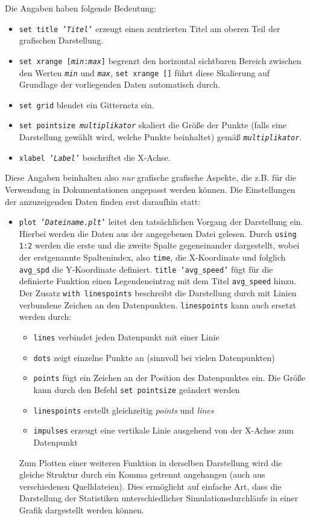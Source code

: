 Die Angaben haben folgende Bedeutung:
\begin{itemize}
\item \texttt{set title '\textit{Titel}'} erzeugt einen zentrierten Titel am oberen Teil der grafischen Darstellung.
\item \texttt{set xrange [\textit{min}:\textit{max}]} begrenzt den horizontal sichtbaren Bereich zwischen den Werten \texttt{\textit{min}} und \texttt{\textit{max}}, \texttt{set xrange []} führt diese Skalierung auf Grundlage der vorliegenden Daten automatisch durch.
\item \texttt{set grid} blendet ein Gitternetz ein.
\item \texttt{set pointsize \textit{multiplikator}} skaliert die Größe der Punkte (falls eine Darstellung gewählt wird, welche Punkte beinhaltet) gemäß \texttt{\textit{multiplikator}}.
\item \texttt{xlabel '\textit{Label}'} beschriftet die X-Achse.
\end{itemize}
Diese Angaben beinhalten also \textit{nur} grafische grafische Aspekte, die z.B. für die Verwendung in Dokumentationen angepasst werden können. Die Einstellungen der anzuzeigenden Daten finden erst daraufhin statt:

\begin{itemize}
 \item \texttt{plot '\textit{Dateiname.plt}'} leitet den tatsächlichen Vorgang der Darstellung ein. Hierbei werden die Daten aus der angegebenen Datei gelesen. Durch \texttt{using 1:2} werden die erste und die zweite Spalte gegeneinander dargestellt, wobei der erstgenannte Spaltenindex, also \texttt{time}, die X-Koordinate und folglich \texttt{avg\_spd} die Y-Koordinate definiert. \texttt{title `avg\_speed'} fügt für die definierte Funktion einen Legendeneintrag mit dem Titel \texttt{avg\_speed} hinzu. Der Zusatz \texttt{with linespoints} beschreibt die Darstellung durch mit Linien verbundene Zeichen an den Datenpunkten. \texttt{linespoints} kann auch ersetzt werden durch:
\begin{itemize}
\item \texttt{lines} verbindet jeden Datenpunkt mit einer Linie
\item \texttt{dots} zeigt einzelne Punkte an (sinnvoll bei vielen Datenpunkten)
\item \texttt{points} fügt ein Zeichen an der Position des Datenpunktes ein. Die Größe kann durch den Befehl \texttt{set pointsize} geändert werden
\item \texttt{linespoints} erstellt gleichzeitig \textit{points} und \textit{lines}
\item \texttt{impulses} erzeugt eine vertikale Linie ausgehend von der X-Achse zum Datenpunkt
\end{itemize}
Zum Plotten einer weiteren Funktion in derselben Darstellung wird die gleiche Struktur durch ein Komma getrennt angehangen (auch aus verschiedenen Quelldateien). Dies ermöglicht auf einfache Art, dass die Darstellung der Statistiken unterschiedlicher Simulationsdurchläufe in einer Grafik dargestellt werden können.
\end{itemize}

